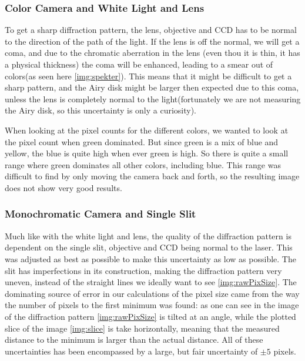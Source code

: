 \documentclass{emulateapj}
\begin{document}
\subsubsection{Color Camera and White Light and Lens}
\label{sec:uncWhiteLight}
To get a sharp diffraction pattern, the lens, objective and CCD has to be normal to the direction of the path of the light. If the lens is off the normal, we will get a coma, and due to the chromatic aberration in the lens (even thou it is thin, it has a physical thickness) the coma will be enhanced, leading to a smear out of colors(as seen here \ref{img:spekter}). This means that it might be difficult to get a sharp pattern, and the Airy disk might be larger then expected due to this coma, unless the lens is completely normal to the light(fortunately we are not measuring the Airy disk, so this uncertainty is only a curiosity).

When looking at the pixel counts for the different colors, we wanted to look at the pixel count when green dominated. But since green is a mix of blue and yellow, the blue is quite high when ever green is high. So there is quite a small range where green dominates all other colors, including blue. This range was difficult to find by only moving the camera back and forth, so the resulting image does not show very good results.

\subsubsection{Monochromatic Camera and Single Slit}
\label{sec:uncSlit}

Much like with the white light and lens, the quality of the diffraction pattern is dependent on the single slit, objective and CCD being normal to the laser. This was adjusted as best as possible to make this uncertainty as low as possible.
The slit has imperfections in its construction, making the diffraction pattern very uneven, instead of the straight lines we ideally want to see \ref{img:rawPixSize}.
The dominating source of error in our calculations of the pixel size came from the way the number of pixels to the first minimum was found: as one can see in the image of the diffraction pattern \ref{img:rawPixSize} is tilted at an angle, while the plotted slice of the image \ref{img:slice} is take horizontally, meaning that the measured distance to the minimum is larger than the actual distance.
All of these uncertainties has been encompassed by a large, but fair uncertainty of $\pm 5$ pixels. 
\end{document}
